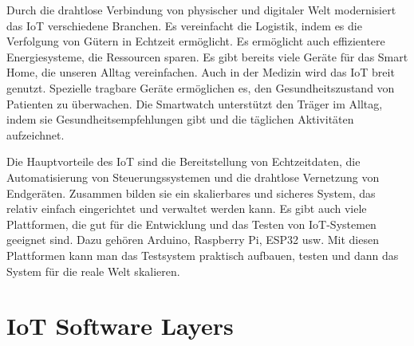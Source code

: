 \documentclass[12pt, a4paper]{article}
\begin{document}
\par Durch die drahtlose Verbindung von physischer und digitaler Welt modernisiert das IoT verschiedene Branchen. Es vereinfacht die Logistik, indem es die Verfolgung von Gütern in Echtzeit ermöglicht. Es ermöglicht auch effizientere Energiesysteme, die Ressourcen sparen. Es gibt bereits viele Geräte für das Smart Home, die unseren Alltag vereinfachen. Auch in der Medizin wird das IoT breit genutzt. Spezielle tragbare Geräte ermöglichen es, den Gesundheitszustand von Patienten zu überwachen. Die Smartwatch unterstützt den Träger im Alltag, indem sie Gesundheitsempfehlungen gibt und die täglichen Aktivitäten aufzeichnet. 
\par Die Hauptvorteile des IoT sind die Bereitstellung von Echtzeitdaten, die Automatisierung von Steuerungssystemen und die drahtlose Vernetzung von Endgeräten. Zusammen bilden sie ein skalierbares und sicheres System, das relativ einfach eingerichtet und verwaltet werden kann. Es gibt auch viele Plattformen, die gut für die Entwicklung und das Testen von IoT-Systemen geeignet sind. Dazu gehören Arduino, Raspberry Pi, ESP32 usw. Mit diesen Plattformen kann man das Testsystem praktisch aufbauen, testen und dann das System für die reale Welt skalieren.
\pagebreak

\section{IoT Software Layers}
\end{document}
